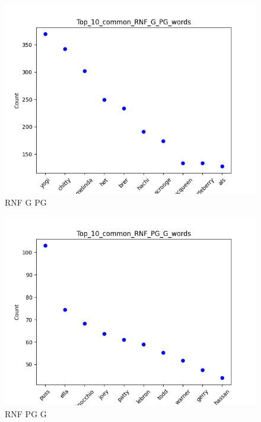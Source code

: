 \documentclass[a4paper]{article}
\begin{document}
\begin{figure}[ht]
    \centering
    \includegraphics[width=1\textwidth]{../stats/Top_10_common_RNF_G_PG_words.png}
    \caption{RNF G PG}
\end{figure}


\begin{figure}[ht]
    \centering
    \includegraphics[width=1\textwidth]{../stats/Top_10_common_RNF_PG_G_words.png}
    \caption{RNF PG G}
\end{figure}
\end{document}
